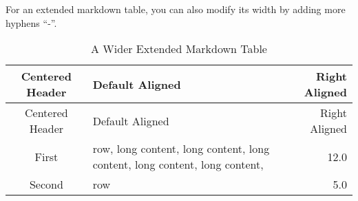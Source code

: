 \documentclass[10pt, a4paper, oneside]{article}
\begin{document}
For an extended markdown table, you can also modify its width by adding more hyphens ``-''.

\begin{longtable}[c]{@{}clr@{}}
\caption{A Wider Extended Markdown Table}\tabularnewline
\toprule
\begin{minipage}[b]{0.27\columnwidth}\centering\strut
Centered
Header
\strut\end{minipage} & \begin{minipage}[b]{0.18\columnwidth}\raggedright\strut
Default
Aligned
\strut\end{minipage} & \begin{minipage}[b]{0.18\columnwidth}\raggedleft\strut
Right
Aligned
\strut\end{minipage}\tabularnewline
\midrule
\endfirsthead
\toprule
\begin{minipage}[b]{0.27\columnwidth}\centering\strut
Centered
Header
\strut\end{minipage} & \begin{minipage}[b]{0.18\columnwidth}\raggedright\strut
Default
Aligned
\strut\end{minipage} & \begin{minipage}[b]{0.18\columnwidth}\raggedleft\strut
Right
Aligned
\strut\end{minipage}\tabularnewline
\midrule
\endhead
\begin{minipage}[t]{0.27\columnwidth}\centering\strut
First
\strut\end{minipage} & \begin{minipage}[t]{0.18\columnwidth}\raggedright\strut
row,
long content,
long content,
long content,
long content,
long content,
\strut\end{minipage} & \begin{minipage}[t]{0.18\columnwidth}\raggedleft\strut
12.0
\strut\end{minipage}\tabularnewline
\begin{minipage}[t]{0.27\columnwidth}\centering\strut
Second
\strut\end{minipage} & \begin{minipage}[t]{0.18\columnwidth}\raggedright\strut
row
\strut\end{minipage} & \begin{minipage}[t]{0.18\columnwidth}\raggedleft\strut
5.0
\strut\end{minipage}\tabularnewline
\bottomrule
\end{longtable}


\printindex
\end{document}
